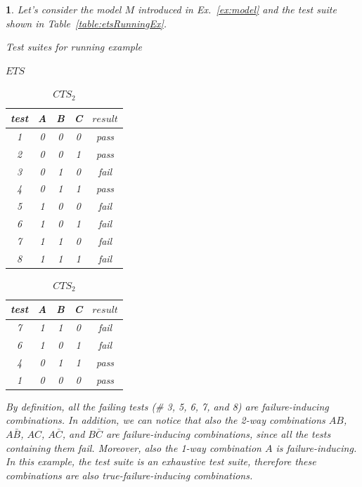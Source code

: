 \documentclass[
12pt, %
oneside, %
english, %
singlespacing, %
headsepline, %
consistentlayout, %
]{MastersDoctoralThesis} %
\newcommand{\result}{\ensuremath{\mathit{result}}\xspace}
\newcommand{\ets}{\ensuremath{\mathit{ETS}}\xspace}
\newcommand{\cts}{\ensuremath{\mathit{CTS}}\xspace}
\newtheorem{example}[thm]{\protect\examplename}
\providecommand{\examplename}{Example}
\theoremstyle{plain}
\theoremstyle{definition}
\theoremstyle{remark}
\theoremstyle{plain}
\theoremstyle{plain}
\providecommand{\examplename}{Example}
\theoremstyle{remark}
\begin{document}
\begin{example}\label{ex:fic}
	Let's consider the model $M$ introduced in Ex.~\ref{ex:model} and the test suite shown in Table~\ref{table:etsRunningEx}.
	\begin{table}[!tb]
		\caption{Test suites for running example}
		\begin{subtable}[t]{.5\columnwidth}
			\caption{\ets}
			\label{table:etsRunningEx}
			\begin{tabular}{c|ccc|c}
				\toprule
				test &A & B & C & \result\\
				\midrule
				1& 0 & 0 & 0 & pass \\
				2& 0 & 0 & 1 & pass \\
				3& 0 & 1 & 0 & fail\\
				4& 0 & 1 & 1 & pass\\
				5& 1 & 0 & 0 & fail\\
				6& 1 & 0 & 1 & fail\\
				7& 1 & 1 & 0 & fail\\
				8& 1 & 1 & 1 & fail\\
				\bottomrule
			\end{tabular}
		\end{subtable}%
		\begin{subtable}[t]{.5\columnwidth}
			\centering
			\caption{$\cts_2$}
			\label{table:ctsRunningEx}
			\begin{tabular}{c|ccc|c}
				\toprule
				test &A & B & C & \result \\
				\midrule
				7 & 1 & 1 & 0 & fail\\
				6 & 1 & 0 & 1 & fail\\
				4 & 0 & 1 & 1 & pass\\
				1 & 0 & 0 & 0 & pass\\
				\bottomrule
			\end{tabular}
		\end{subtable} 
	\end{table}
	By definition, all the failing tests (\# 3, 5, 6, 7, and 8) are failure-inducing combinations. In addition, we can notice that also the 2-way combinations $AB$, $A\bar{B}$, $AC$, $A\bar{C}$, and $B\bar{C}$ are failure-inducing combinations, since all the tests containing them fail. Moreover, also the 1-way combination $A$ is failure-inducing. In this example, the test suite is an exhaustive test suite, therefore these combinations are also \textit{true}-failure-inducing combinations.
\end{example}
\end{document}
